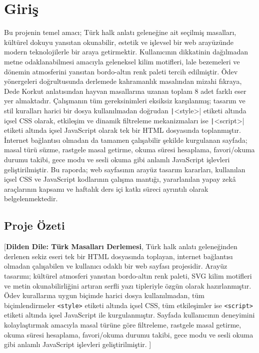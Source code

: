 \documentclass[12pt,a4paper]{article}
\begin{document}
\section{Giriş}
{Bu projenin temel amacı; Türk halk anlatı geleneğine ait seçilmiş masalları, kültürel dokuyu yansıtan okunabilir, estetik ve işlevsel bir web arayüzünde modern teknolojilerle bir araya getirmektir. Kullanıcının dikkatinin dağılmadan metne odaklanabilmesi amacıyla geleneksel kilim motifleri, lale bezemeleri ve dönemin atmosferini yansıtan bordo-altın renk paleti tercih edilmiştir. Ödev yönergeleri doğrultusunda derlemede kahramanlık masalından mizahi fıkraya, Dede Korkut anlatısından hayvan masallarına uzanan toplam 8 adet farklı eser yer almaktadır. Çalışmanın tüm gereksinimleri eksiksiz karşılanmış; tasarım ve stil kuralları harici bir dosya kullanılmadan doğrudan \texttt|<style>| etiketi altında içsel CSS olarak, etkileşim ve dinamik filtreleme mekanizmaları ise \texttt|<script>| etiketi altında içsel JavaScript olarak tek bir HTML dosyasında toplanmıştır. İnternet bağlantısı olmadan da tamamen çalışabilir şekilde kurgulanan sayfada; masal türü süzme, rastgele masal getirme, okuma süresi hesaplama, favori/okuma durumu takibi, gece modu ve sesli okuma gibi anlamlı JavaScript işlevleri geliştirilmiştir. Bu raporda; web sayfasının arayüz tasarım kararları, kullanılan içsel CSS ve JavaScript kodlarının çalışma mantığı, yararlanılan yapay zekâ araçlarının kapsamı ve haftalık ders içi katkı süreci ayrıntılı olarak belgelenmektedir. }

\subsection{Proje Özeti}
[\textbf{Dilden Dile: Türk Masalları Derlemesi}, Türk halk anlatı geleneğinden derlenen sekiz eseri tek bir HTML dosyasında toplayan, internet bağlantısı olmadan çalışabilen ve kullanıcı odaklı bir web sayfası projesidir. Arayüz tasarımı; kültürel atmosferi yansıtan bordo-altın renk paleti, SVG kilim motifleri ve metin okunabilirliğini artıran serfli yazı tipleriyle özgün olarak hazırlanmıştır. Ödev kurallarına uygun biçimde harici dosya kullanılmadan, tüm biçimlendirmeler \verb|<style>| etiketi altında içsel CSS, tüm etkileşimler ise \verb|<script>| etiketi altında içsel JavaScript ile kurgulanmıştır. Sayfada kullanıcının deneyimini kolaylaştırmak amacıyla masal türüne göre filtreleme, rastgele masal getirme, okuma süresi hesaplama, favori/okuma durumu takibi, gece modu ve sesli okuma gibi anlamlı JavaScript işlevleri geliştirilmiştir. ]
\end{document}
